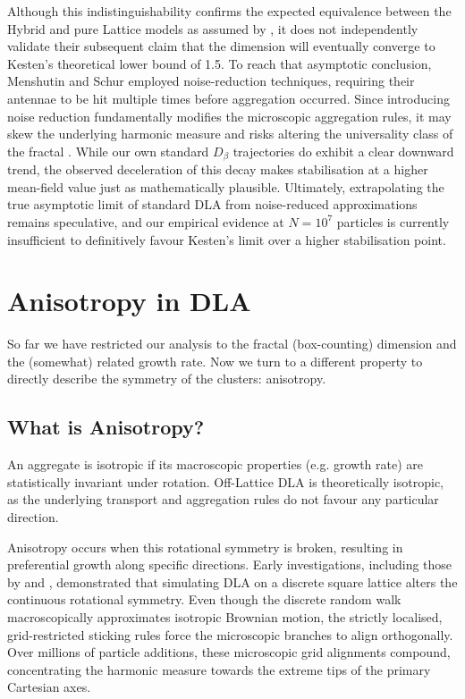 \documentclass[12pt, a4paper, oneside]{report}
\theoremstyle{remark}
\begin{document}
Although this indistinguishability confirms the expected equivalence between the Hybrid and pure Lattice models as assumed by \cite{Menshutin2011}, it does not independently validate their subsequent claim that the dimension will eventually converge to Kesten's theoretical lower bound of 1.5. To reach that asymptotic conclusion, Menshutin and Schur employed noise-reduction techniques, requiring their antennae to be hit multiple times before aggregation occurred. Since introducing noise reduction fundamentally modifies the microscopic aggregation rules, it may skew the underlying harmonic measure and risks altering the universality class of the fractal \cite{novotny1990}. While our own standard $D_\beta$ trajectories do exhibit a clear downward trend, the observed deceleration of this decay makes stabilisation at a higher mean-field value just as mathematically plausible. Ultimately, extrapolating the true asymptotic limit of standard DLA from noise-reduced approximations remains speculative, and our empirical evidence at $N=10^7$ particles is currently insufficient to definitively favour Kesten's limit over a higher stabilisation point.

\chapter{Anisotropy in DLA}
\label{ch:anisotropy}
So far we have restricted our analysis to the fractal (box-counting) dimension and the (somewhat) related growth rate. Now we turn to a different property to directly describe the symmetry of the clusters: anisotropy.
\section{What is Anisotropy?}
\label{sec:anisotropy_overview}
An aggregate is isotropic if its macroscopic properties (e.g. growth rate) are statistically invariant under rotation. Off-Lattice DLA is theoretically isotropic, as the underlying transport and aggregation rules do not favour any particular direction. 

Anisotropy occurs when this rotational symmetry is broken, resulting in preferential growth along specific directions. Early investigations, including those by \cite{meakin1986} and \cite{Ball1985}, demonstrated that simulating DLA on a discrete square lattice alters the continuous rotational symmetry. Even though the discrete random walk macroscopically approximates isotropic Brownian motion, the strictly localised, grid-restricted sticking rules force the microscopic branches to align orthogonally. Over millions of particle additions, these microscopic grid alignments compound, concentrating the harmonic measure towards the extreme tips of the primary Cartesian axes.
\end{document}
